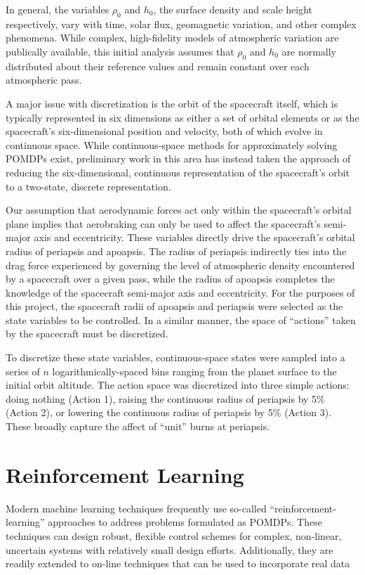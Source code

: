 \documentclass[paper,11pt]{AAS}		%
\begin{document}
In general, the variables $\rho_0$ and $h_0$, the surface density and scale height respectively, vary with time, solar flux, 
geomagnetic variation, and other complex phenomena. While complex, high-fidelity models of atmospheric variation are publically 
available, this initial analysis assumes that $\rho_0$ and $h_0$ are normally distributed about their reference values and 
remain constant over each atmospheric pass.

A major issue with discretization is the orbit of the spacecraft itself, which is typically represented in six dimensions as 
either a set of orbital elements or as the spacecraft's six-dimensional position and velocity, both of which evolve in 
continuous space. While continuous-space methods for approximately solving POMDPs exist, preliminary work in this area has 
instead taken the 
approach of reducing the six-dimensional, continuous representation of the spacecraft's orbit to a two-state, discrete 
representation. 

Our assumption that aerodynamic forces act only within the spacecraft's orbital plane implies that aerobraking can only be used 
to affect the spacecraft's semi-major axis and eccentricity. These variables directly drive the spacecraft's orbital radius of 
periapsis and apoapsis. The radius of periapsis indirectly ties into the drag force experienced by governing the level of 
atmospheric density encountered by a spacecraft over a given pass, while the radius of apoapsis completes the knowledge of the 
spacecraft semi-major axis and eccentricity. For the purposes of this project, the spacecraft radii of apoapsis and periapsis 
were selected as the state variables to be controlled. In a similar manner, the space of ``actions'' taken by the spacecraft 
must be discretized.

To discretize these state variables, continuous-space states were sampled into a series of $n$ logarithmically-spaced bins 
ranging from the planet surface to the initial orbit altitude. The action space was discretized into three simple actions: 
doing nothing (Action 1), raising the continuous radius of periapsis by 5\% (Action 2), or lowering the continuous radius of 
periapsis by 5\% (Action 3). These broadly capture the affect 
of ``unit'' burns at periapsis. 

\section{Reinforcement Learning}

Modern machine learning techniques frequently use so-called ``reinforcement-learning'' approaches to address problems 
formulated as POMDPs. These techniques can design robust, flexible control schemes for  complex, non-linear, uncertain systems 
with relatively small design efforts. Additionally, they are readily extended to on-line techniques that can be used to 
incorporate real data
\end{document}

